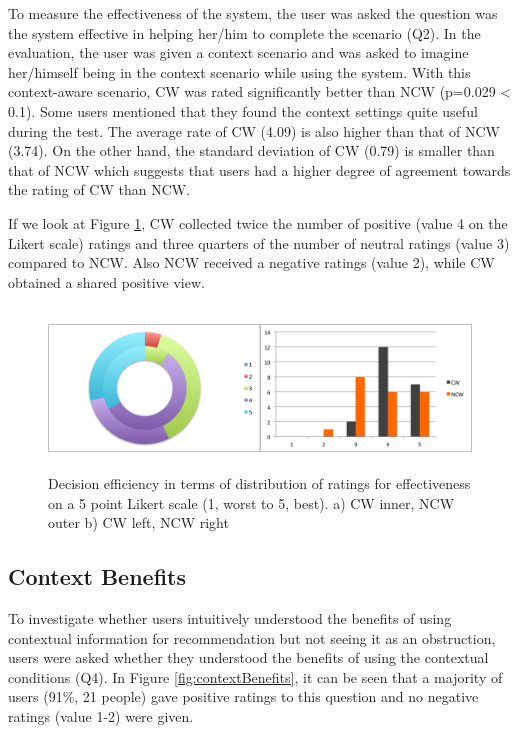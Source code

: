 To measure the effectiveness of the system, the user was asked the question was the system effective in helping her/him to complete the scenario (Q2). In the evaluation, the user was given a context scenario and was asked to imagine her/himself being in the context scenario while using the system. With this context-aware scenario, CW was rated significantly better than NCW (p=0.029 < 0.1). Some users mentioned that they found the context settings quite useful during the test. The average rate of CW (4.09) is also higher than that of NCW (3.74). On the other hand, the standard deviation of CW (0.79) is smaller than that of NCW which suggests that users had a higher degree of agreement towards the rating of CW than NCW.

If we look at Figure \ref{fig:effectiveness}, CW collected twice the number of positive (value 4 on the Likert scale) ratings and three quarters of the number of neutral ratings (value 3) compared to NCW. Also NCW received a negative ratings (value 2), while CW obtained a shared positive view.

\begin{figure}[H]
	\centering
	\includegraphics[height=1.7in]{figures/effectiveness.png}
	\caption{Decision efficiency in terms of distribution of ratings for effectiveness on a 5 point Likert scale (1, worst to 5, best). a) CW inner, NCW outer b) CW left, NCW right}
	\label{fig:effectiveness}
\end{figure}

\subsection{Context Benefits} \label{sec:results_cb}

To investigate whether users intuitively understood the benefits of using contextual information for recommendation but not seeing it as an obstruction, users were asked whether they understood the benefits of using the contextual conditions (Q4). In Figure \ref{fig:contextBenefits}, it can be seen that a majority of users (91\%, 21 people) gave positive ratings to this question and no negative ratings (value 1-2) were given.

